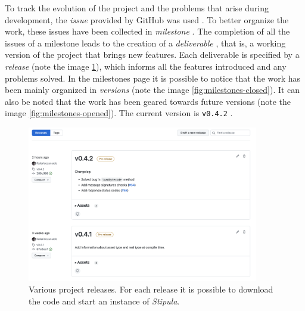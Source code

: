 To track the evolution of the project and the problems that arise during development, the \textit{issue} 
provided by GitHub was used \autocite{site:stipula-github-issues-section}. To better organize the work, 
these issues have been collected in \textit{milestone} \autocite*{site:stipula-github-milestones-section}. 
The completion of all the issues of a milestone leads to the creation of a \textit{deliverable} 
\autocite{site:stipula-github-releases}, that is, a working version of the project that brings new 
features. Each deliverable is specified by a \textit{release} (note the image \ref{fig:releases}), which 
informs all the features introduced and any problems solved. In the milestones page it is possible to 
notice that the work has been mainly organized in \textit{versions} (note the image 
\ref{fig:milestones-closed}). It can also be noted that the work has been geared towards future versions 
(note the image \ref{fig:milestones-opened}). The current version is \verb|v0.4.2| 
\autocite{site:stipula-github-last-release}. 

\begin{figure}[htbp]
	\begin{center}
		\includegraphics[width=0.9\textwidth]{immagini/capitolo-5/releases.png}
		\caption{Various project releases. For each release it is possible to download the code and start an 
    instance of \textit{Stipula}.}
		\label{fig:releases}
	\end{center}
\end{figure}

